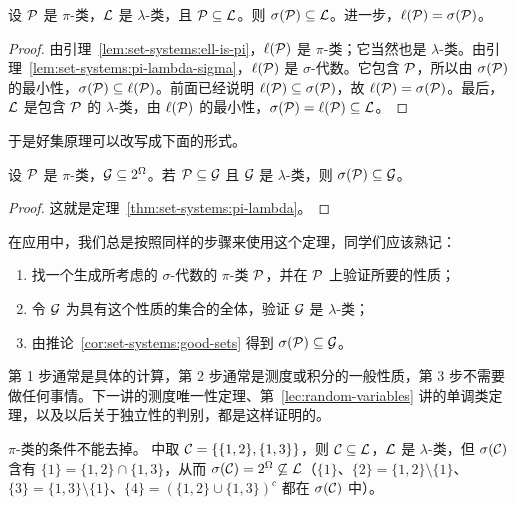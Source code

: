 \begin{theorem}\label{thm:set-systems:pi-lambda}
设 $\mathcal{P}$ 是 $\pi$-类，$\mathcal{L}$ 是 $\lambda$-类，且 $\mathcal{P}\subseteq\mathcal{L}$。则 $\sigma(\mathcal{P})\subseteq\mathcal{L}$。进一步，$\ell(\mathcal{P})=\sigma(\mathcal{P})$。
\end{theorem}
\begin{proof}
由引理~\ref{lem:set-systems:ell-is-pi}，$\ell(\mathcal{P})$ 是 $\pi$-类；它当然也是 $\lambda$-类。由引理~\ref{lem:set-systems:pi-lambda-sigma}，$\ell(\mathcal{P})$ 是 $\sigma$-代数。它包含 $\mathcal{P}$，所以由 $\sigma(\mathcal{P})$ 的最小性，$\sigma(\mathcal{P})\subseteq\ell(\mathcal{P})$。前面已经说明 $\ell(\mathcal{P})\subseteq\sigma(\mathcal{P})$，故 $\ell(\mathcal{P})=\sigma(\mathcal{P})$。最后，$\mathcal{L}$ 是包含 $\mathcal{P}$ 的 $\lambda$-类，由 $\ell(\mathcal{P})$ 的最小性，$\sigma(\mathcal{P})=\ell(\mathcal{P})\subseteq\mathcal{L}$。
\end{proof}

于是好集原理可以改写成下面的形式。

\begin{corollary}\label{cor:set-systems:good-sets}
设 $\mathcal{P}$ 是 $\pi$-类，$\mathcal{G}\subseteq2^\Omega$。若 $\mathcal{P}\subseteq\mathcal{G}$ 且 $\mathcal{G}$ 是 $\lambda$-类，则 $\sigma(\mathcal{P})\subseteq\mathcal{G}$。
\end{corollary}
\begin{proof}
这就是定理~\ref{thm:set-systems:pi-lambda}。
\end{proof}

\begin{remark}
在应用中，我们总是按照同样的步骤来使用这个定理，同学们应该熟记：
\begin{enumerate}
\item 找一个生成所考虑的 $\sigma$-代数的 $\pi$-类 $\mathcal{P}$，并在 $\mathcal{P}$ 上验证所要的性质；
\item 令 $\mathcal{G}$ 为具有这个性质的集合的全体，验证 $\mathcal{G}$ 是 $\lambda$-类；
\item 由推论~\ref{cor:set-systems:good-sets} 得到 $\sigma(\mathcal{P})\subseteq\mathcal{G}$。
\end{enumerate}
第 1 步通常是具体的计算，第 2 步通常是测度或积分的一般性质，第 3 步不需要做任何事情。下一讲的测度唯一性定理、第~\ref{lec:random-variables} 讲的单调类定理，以及以后关于独立性的判别，都是这样证明的。
\end{remark}

\begin{remark}
$\pi$-类的条件不能去掉。 中取 $\mathcal{C}=\{\{1,2\},\{1,3\}\}$，则 $\mathcal{C}\subseteq\mathcal{L}$，$\mathcal{L}$ 是 $\lambda$-类，但 $\sigma(\mathcal{C})$ 含有 $\{1\}=\{1,2\}\cap\{1,3\}$，从而 $\sigma(\mathcal{C})=2^\Omega\not\subseteq\mathcal{L}$（$\{1\}$、$\{2\}=\{1,2\}\setminus\{1\}$、$\{3\}=\{1,3\}\setminus\{1\}$、$\{4\}=(\{1,2\}\cup\{1,3\})^c$ 都在 $\sigma(\mathcal{C})$ 中）。
\end{remark}


